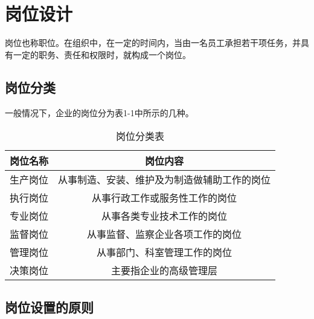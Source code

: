 \section {岗位设计}
    岗位也称职位。在组织中，在一定的时间内，当由一名员工承担若干项任务，并具有一定的职务、责任和权限时，就构成一个岗位。

    \subsection {岗位分类}

        一般情况下，企业的岗位分为表1-1中所示的几种。
        \begin{table}
		    \centering
            \caption{岗位分类表}
            \begin{tabular}{c|c}
                \hline  岗位名称&岗位内容 \\
                \hline  生产岗位&从事制造、安装、维护及为制造做辅助工作的岗位 \\
                \hline  执行岗位&从事行政工作或服务性工作的岗位 \\
                \hline  专业岗位&从事各类专业技术工作的岗位 \\
                \hline  监督岗位&从事监督、监察企业各项工作的岗位 \\
                \hline  管理岗位&从事部门、科室管理工作的岗位 \\
                \hline  决策岗位&主要指企业的高级管理层 \\
                \hline
            \end{tabular}
        \end{table}


    \subsection {岗位设置的原则}

